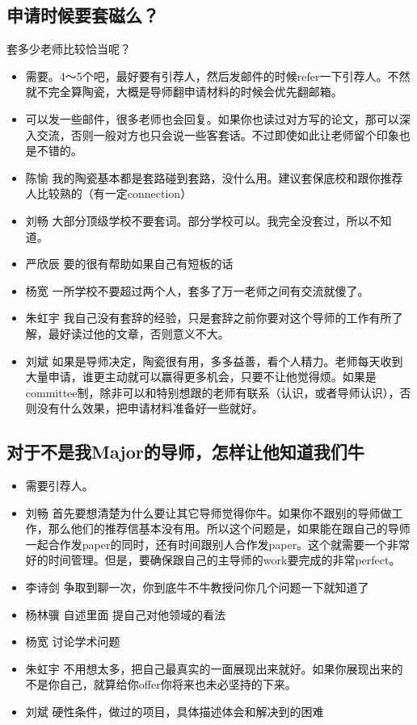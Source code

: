\documentclass{vivid_layout}
\begin{document}
\subsection{申请时候要套磁么？}
套多少老师比较恰当呢？
\begin{itemize}
\item 需要。4～5个吧，最好要有引荐人，然后发邮件的时候refer一下引荐人。不然就不完全算陶瓷，大概是导师翻申请材料的时候会优先翻邮箱。
\item 可以发一些邮件，很多老师也会回复。如果你也读过对方写的论文，那可以深入交流，否则一般对方也只会说一些客套话。不过即使如此让老师留个印象也是不错的。
\item  { 陈愉}  \quad 我的陶瓷基本都是套路碰到套路，没什么用。建议套保底校和跟你推荐人比较熟的（有一定connection）
\item  { 刘畅}  \quad 大部分顶级学校不要套词。部分学校可以。我完全没套过，所以不知道。
\item  { 严欣辰}  \quad 要的很有帮助如果自己有短板的话
\item  { 杨宽}  \quad 一所学校不要超过两个人，套多了万一老师之间有交流就傻了。
\item  { 朱虹宇}  \quad 我自己没有套辞的经验，只是套辞之前你要对这个导师的工作有所了解，最好读过他的文章，否则意义不大。
\item  { 刘斌}  \quad 如果是导师决定，陶瓷很有用，多多益善，看个人精力。老师每天收到大量申请，谁更主动就可以赢得更多机会，只要不让他觉得烦。如果是committee制，除非可以和特别想跟的老师有联系（认识，或者导师认识），否则没有什么效果，把申请材料准备好一些就好。
\end{itemize}

\subsection{对于不是我Major的导师，怎样让他知道我们牛}
\begin{itemize}
\item 需要引荐人。
\item  { 刘畅}  \quad 首先要想清楚为什么要让其它导师觉得你牛。如果你不跟别的导师做工作，那么他们的推荐信基本没有用。所以这个问题是，如果能在跟自己的导师一起合作发paper的同时，还有时间跟别人合作发paper。这个就需要一个非常好的时间管理。但是，要确保跟自己的主导师的work要完成的非常perfect。
\item  { 李诗剑}  \quad 争取到聊一次，你到底牛不牛教授问你几个问题一下就知道了
\item  { 杨林骥}  \quad 自述里面 提自己对他领域的看法
\item  { 杨宽}  \quad 讨论学术问题
\item  { 朱虹宇}  \quad 不用想太多，把自己最真实的一面展现出来就好。如果你展现出来的不是你自己，就算给你offer你将来也未必坚持的下来。
\item  { 刘斌}  \quad 硬性条件，做过的项目，具体描述体会和解决到的困难
\end{itemize}
\end{document}
